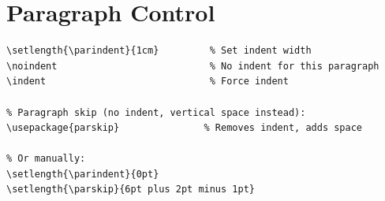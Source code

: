 \section{Paragraph Control}

\begin{lstlisting}[language={[LaTeX]TeX}, caption=Paragraph control]
% Paragraph indent:
\setlength{\parindent}{1cm}         % Set indent width
\noindent                           % No indent for this paragraph
\indent                             % Force indent

% Paragraph skip (no indent, vertical space instead):
\usepackage{parskip}               % Removes indent, adds space

% Or manually:
\setlength{\parindent}{0pt}
\setlength{\parskip}{6pt plus 2pt minus 1pt}
\end{lstlisting}
